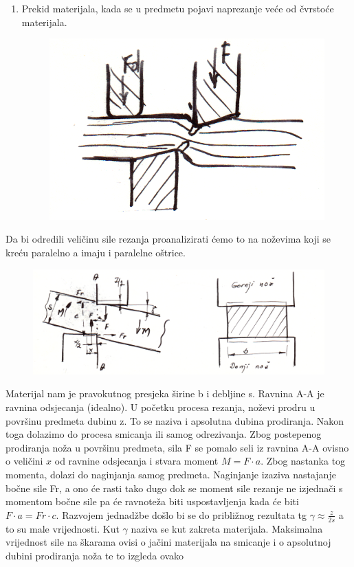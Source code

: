 \documentclass[a4paper,12pt]{article}
\numberwithin{figure}{section}
\begin{document}
\begin{enumerate}
\begin{figure}[!h]
\end{figure}
\FloatBarrier
\item Prekid materijala, kada se u predmetu pojavi naprezanje veće od čvrstoće materijala. 
\begin{figure}[!h]
\centering
\includegraphics[scale=0.15]{image_53-3.png}
\end{figure}
\FloatBarrier
\end{enumerate}
Da bi odredili veličinu sile rezanja proanalizirati ćemo to na noževima koji se kreću paralelno a imaju i paralelne oštrice.
\begin{figure}[!h]
\centering
\includegraphics[scale=0.15]{image_53-4.png}
\end{figure}
\FloatBarrier
Materijal nam je pravokutnog presjeka širine b i debljine s. Ravnina A-A je ravnina odsjecanja (idealno). U početku procesa rezanja, noževi prodru u površinu predmeta dubinu z. To se naziva i apsolutna dubina prodiranja. Nakon toga dolazimo do procesa smicanja ili samog odrezivanja. Zbog postepenog prodiranja noža u površinu predmeta, sila F se pomalo seli iz ravnina A-A ovisno o veličini $x$ od ravnine odsjecanja i stvara moment $M = F \cdot a$. Zbog nastanka tog momenta, dolazi do naginjanja samog predmeta. Naginjanje izaziva nastajanje bočne sile Fr, a ono će rasti tako dugo dok se moment sile rezanje ne izjednači s momentom bočne sile pa će ravnoteža biti uspostavljenja kada će biti $F\cdot a = Fr \cdot c$. Razvojem jednadžbe došlo bi se do približnog rezultata tg $\gamma\approx\frac{z}{2 s}$ a to su male vrijednosti. Kut $\gamma$ naziva se kut zakreta materijala. Maksimalna vrijednost sile na škarama ovisi o jačini materijala na smicanje i o apsolutnoj dubini prodiranja noža te to izgleda ovako
\end{document}
